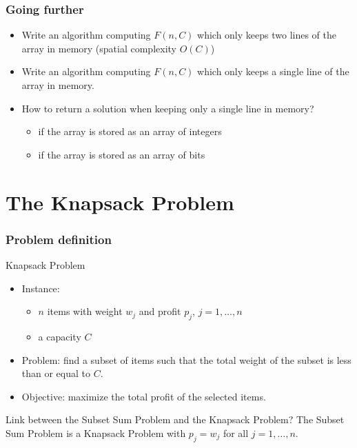 \documentclass{beamer}
\begin{document}
\begin{frame}
  \frametitle{Going further}

  \begin{itemize}
    \item Write an algorithm computing $F(n, C)$ which only keeps two lines of the array in memory (spatial complexity $O(C)$)
    \item Write an algorithm computing $F(n, C)$ which only keeps a single line of the array in memory.
    \item How to return a solution when keeping only a single line in memory?
      \begin{itemize}
        \item if the array is stored as an array of integers
        \item if the array is stored as an array of bits
      \end{itemize}
  \end{itemize}

\end{frame}

\section{The Knapsack Problem}

\begin{frame}
  \frametitle{Problem definition}

  \begin{block}{Knapsack Problem}
    \begin{itemize}
      \item Instance:
        \begin{itemize}
          \item $n$ items with weight \alert{$w_j$} and profit \alert{$p_j$}, $j = 1, \dots, n$
          \item a capacity \alert{$C$}
        \end{itemize}
      \item Problem: find a subset of items such that the total weight of the subset is less than or equal to $C$.
      \item Objective: maximize the total profit of the selected items.
    \end{itemize}
  \end{block}

  \pause
  Link between the Subset Sum Problem and the Knapsack Problem?
  \pause
  The Subset Sum Problem is a Knapsack Problem with $p_j = w_j$ for all $j = 1, \dots, n$.
\end{frame}
\end{document}
